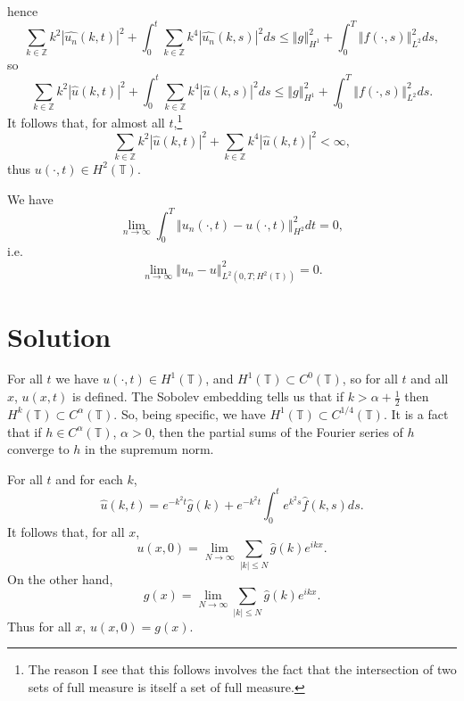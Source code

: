 \documentclass{article}
\newcommand{\norm}[1]{\left\Vert #1 \right\Vert}
\begin{document}
hence
\[
\sum_{k \in \mathbb{Z}} k^2 |\widehat{u_n}(k,t)|^2 + \int_0^t \sum_{k \in \mathbb{Z}} k^4 |\widehat{u_n}(k,s)|^2 ds\leq \norm{g}_{H^1}^2 +  \int_0^T \norm{f(\cdot,s)}_{L^2}^2 ds,
\]
so
\[
\sum_{k \in \mathbb{Z}}  k^2| \widehat{u}(k,t)|^2 + \int_0^t \sum_{k \in \mathbb{Z}} k^4 |\widehat{u}(k,s)|^2 ds\leq \norm{g}_{H^1}^2 +  \int_0^T \norm{f(\cdot,s)}_{L^2}^2 ds.
\]
It follows that, for almost all $t$,\footnote{The reason I see that this follows involves the fact that the intersection of two sets of full measure is itself a set of full measure.}
\[
\sum_{k \in \mathbb{Z}}  k^2| \widehat{u}(k,t)|^2 + \sum_{k \in \mathbb{Z}} k^4 |\widehat{u}(k,t)|^2<\infty,
\]
thus $u(\cdot,t) \in H^2(\mathbb{T})$.

We have
\[
\lim_{n \to \infty} \int_0^T \norm{u_n(\cdot,t)-u(\cdot,t)}_{H^2}^2 dt=0,
\]
i.e.
\[
\lim_{n \to \infty} \norm{u_n -u}_{L^2(0,T;H^2(\mathbb{T}))}^2 = 0.
\]

\section{Solution}
For all $t$ we have $u(\cdot,t) \in H^1(\mathbb{T})$, and $H^1(\mathbb{T}) \subset C^0(\mathbb{T})$, so for all $t$ and all $x$, $u(x,t)$ is defined.
The Sobolev embedding tells us that if $k>\alpha+\frac{1}{2}$ then $H^k(\mathbb{T}) \subset C^\alpha(\mathbb{T})$. So, being
specific, we have $H^1(\mathbb{T}) \subset C^{1/4}(\mathbb{T})$. It is a fact that if $h \in C^\alpha(\mathbb{T})$, $\alpha>0$,
then the partial sums of the Fourier series of $h$ converge to $h$ in the supremum norm.

For all $t$ and for each $k$, 
\[
\hat{u}(k,t)=e^{-k^2 t} \widehat{g}(k) + e^{-k^2 t}  \int_0^t e^{k^2 s} \widehat{f}(k,s) ds.
\]
It follows that, for all $x$,
\[
u(x,0)=\lim_{N \to \infty} \sum_{|k| \leq N} \widehat{g}(k)  e^{ikx}.
\]
On the other hand,
\[
g(x)=\lim_{N \to \infty} \sum_{|k| \leq N} \widehat{g}(k)  e^{ikx}.
\]
Thus for all $x$, $u(x,0)=g(x)$. 
\end{document}
